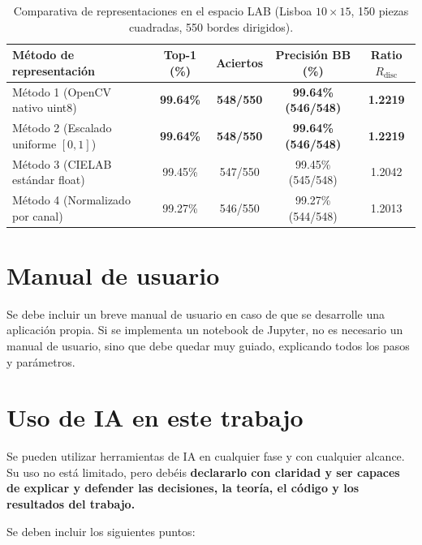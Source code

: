 \documentclass[a4paper]{article}
\theoremstyle{plain} %
\theoremstyle{plain} %
\begin{document}
\begin{table}[htbp]
\centering
\caption{Comparativa de representaciones en el espacio LAB (Lisboa $10 \times 15$, 150 piezas cuadradas, 550 bordes dirigidos).}
\label{tab:comparativa_lab}
\begin{tabular}{lcccc}
\toprule
\textbf{Método de representación} & \textbf{Top-1 (\%)} & \textbf{Aciertos} & \textbf{Precisión BB (\%)} & \textbf{Ratio $R_{\text{disc}}$} \\
\midrule
Método 1 (OpenCV nativo uint8) & \textbf{99.64\%} & \textbf{548/550} & \textbf{99.64\% (546/548)} & \textbf{1.2219} \\
Método 2 (Escalado uniforme $[0,1]$) & \textbf{99.64\%} & \textbf{548/550} & \textbf{99.64\% (546/548)} & \textbf{1.2219} \\
Método 3 (CIELAB estándar float) & 99.45\% & 547/550 & 99.45\% (545/548) & 1.2042 \\
Método 4 (Normalizado por canal) & 99.27\% & 546/550 & 99.27\% (544/548) & 1.2013 \\
\bottomrule
\end{tabular}
\end{table}

\section{Manual de usuario}

Se debe incluir un breve manual de usuario en caso de que se desarrolle una aplicación propia. Si se implementa un notebook de Jupyter, no es necesario un manual de usuario, sino que debe quedar muy guiado, explicando todos los pasos y parámetros.  

\section{Uso de IA en este trabajo} Se pueden utilizar herramientas de IA en cualquier fase y con cualquier alcance. Su uso no está limitado, pero debéis \textbf{declararlo con claridad y ser capaces de explicar y defender las decisiones, la teoría, el código y los resultados del trabajo.} 

Se deben incluir los siguientes puntos:
\end{document}
